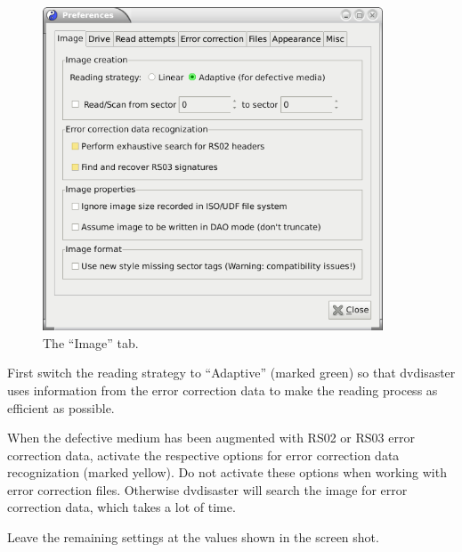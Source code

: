 \begin{figure}[h]
\centerline{\includegraphics[width=0.9\textwidth]{screenshots/recover-prefs-image.png}}
\caption{The ``Image'' tab.}  
\label{howto-recover-prefs-image}
\end{figure}

First switch the reading strategy to ``Adaptive'' (marked green)
so that dvdisaster uses information from the error correction data
to make the reading process as efficient as possible.

\medskip

When the defective medium has been augmented with RS02 or RS03
error correction data, activate the respective options for error
correction data recognization (marked yellow). Do not activate
these options when working with error correction files. Otherwise
dvdisaster will search the image for error correction data, which
takes a lot of time.

\medskip

Leave the remaining settings at the values shown in the screen shot. 

\newpage

